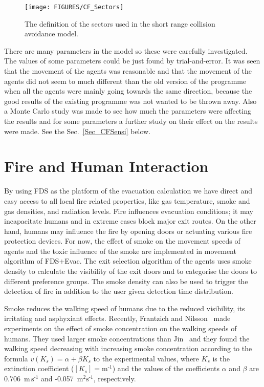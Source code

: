 \documentclass[12pt,a4paper,final,twoside]{stylevk}
\begin{document}
%
\begin{figure}[!tb]
  \centerline{ \texttt{[image: FIGURES/CF\_Sectors]}} 
  \caption{The definition of the sectors used in the short range
    collision avoidance model.}\label{Fig_CFsectors}
\end{figure}


There are many parameters in the model so these were carefully
investigated.  The values of some parameters could be just found by
trial-and-error.  It was seen that the movement of the agents was
reasonable and that the movement of the agents did not seem to much
different than the old version of the programme when all the agents
were mainly going towards the same direction, because the good results
of the existing programme was not wanted to be thrown away.  Also a
Monte Carlo study was made to see how much the parameters were
affecting the results and for some parameters a further study on their
effect on the results were made.  See the Sec.~\ref{Sec_CFSensi}
below.


\section{Fire and Human Interaction}\label{Sec_FireHumanInt}

\noindent By using FDS as the platform of the evacuation calculation
we have direct and easy access to all local fire related properties,
like gas temperature, smoke and gas densities, and radiation levels.
Fire influences evacuation conditions; it may incapacitate humans and
in extreme cases block major exit routes.  On the other hand, humans
may influence the fire by opening doors or actuating various fire
protection devices.  For now, the effect of smoke on the movement
speeds of agents and the toxic influence of the smoke are implemented
in movement algorithm of FDS+Evac.  The exit selection algorithm of
the agents uses smoke density to calculate the visibility of the exit
doors and to categorise the doors to different preference groups.
The smoke density can also be used to trigger the detection of fire in
addition to the user given detection time distribution.


Smoke reduces the walking speed of humans due to the reduced
visibility, its irritating and asphyxiant effects.  Recently,
Frantzich and Nilsson~\cite{Frantzich03} made experiments on the
effect of smoke concentration on the walking speeds of humans.  They
used larger smoke concentrations than Jin~\cite{Jin78} and they found
the walking speed decreasing with increasing smoke concentration
according to the formula $v (K_s) = \alpha + \beta K_s $ to the
experimental values, where $K_s$ is the extinction coefficient ($[K_s]
\!\! = \!\!  \mathrm{ \textrm{m}^\textrm{-1} } $) and the values of
the coefficients $\alpha$ and $\beta$ are 0.706~$\mathrm{ \textrm{m}
  \, \textrm{s}^\textrm{-1} } $ and -0.057~$\mathrm{
  \textrm{m}^\textrm{2} \textrm{s}^\textrm{-1} } $, respectively.
\end{document}
